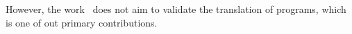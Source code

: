However, the work~\cite{Martignoni:ASPLOS2012} does not aim to validate the 
translation of \ISA programs, 
which is one of out primary contributions. 

